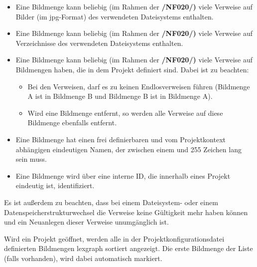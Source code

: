 	\begin{itemize}
		
		\item Eine Bildmenge kann beliebig (im Rahmen der \textbf{/NF020/)} viele Verweise auf Bilder (im \gls{jpg}-Format) des verwendeten Dateisystems enthalten.
		
		\item Eine Bildmenge kann beliebig (im Rahmen der \textbf{/NF020/)} viele Verweise auf Verzeichnisse des verwendeten Dateisystems enthalten.
		
		\item Eine Bildmenge kann beliebig (im Rahmen der \textbf{/NF020/)} viele Verweise auf Bildmengen haben, die in dem Projekt definiert sind. Dabei ist zu beachten:
		
			\begin{itemize}
			
				\item Bei den Verweisen, darf es zu keinen Endlosverweisen führen (Bildmenge A ist in Bildmenge B und Bildmenge B ist in Bildmenge A).
				
				\item Wird eine Bildmenge entfernt, so werden alle Verweise auf diese Bildmenge ebenfalls entfernt.
			
			\end{itemize}
		
		\item Eine Bildmenge hat einen frei definierbaren und vom Projektkontext abhängigen eindeutigen Namen, der zwischen einem und 255 Zeichen lang sein muss.
		
		\item Eine Bildmenge wird über eine interne ID, die innerhalb eines Projekt eindeutig ist, identifiziert.
	
	\end{itemize}
	
	Es ist außerdem zu beachten, dass bei einem Dateisystem- oder einem Datenspeicherstrukturwechsel die Verweise keine Gültigkeit mehr haben können und ein Neuanlegen dieser Verweise unumgänglich ist.\par Wird ein Projekt geöffnet, werden alle in der Projektkonfigurationsdatei definierten Bildmengen \gls{lexgraph} sortiert angezeigt. Die erste Bildmenge der Liste (falls vorhanden), wird dabei automatisch markiert.
	
